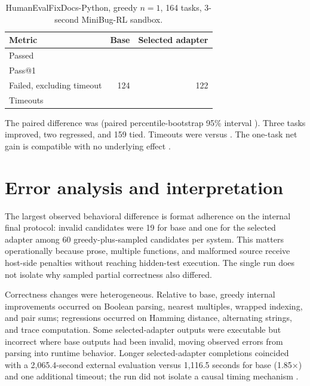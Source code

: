 \documentclass[11pt]{article}
\begin{document}
\begin{table}[ht]
\centering
\caption{HumanEvalFixDocs-Python, greedy $n=1$, 164 tasks, 3-second MiniBug-RL sandbox.}
\label{tab:external}
\begin{tabular}{@{}lrr@{}}
\toprule
Metric & Base & Selected adapter \\
\midrule
Passed & \BaseExternalPassed{} & \ModelExternalPassed{} \\
Pass@1 & \BaseExternalRate{} & \ModelExternalRate{} \\
Failed, excluding timeout & 124 & 122 \\
Timeouts & \BaseExternalTimeouts{} & \ModelExternalTimeouts{} \\
\bottomrule
\end{tabular}
\end{table}

The paired difference was \ExternalDifference{} (paired percentile-bootstrap 95\% interval \ExternalInterval{}). Three tasks improved, two regressed, and 159 tied. Timeouts were \BaseExternalTimeouts{} versus \ModelExternalTimeouts{}. The one-task net gain is compatible with no underlying effect \cite{hubresults,taskscores}.

\section{Error analysis and interpretation}

The largest observed behavioral difference is format adherence on the internal final protocol: invalid candidates were 19 for base and one for the selected adapter among 60 greedy-plus-sampled candidates per system. This matters operationally because prose, multiple functions, and malformed source receive host-side penalties without reaching hidden-test execution. The single run does not isolate why sampled partial correctness also differed.

Correctness changes were heterogeneous. Relative to base, greedy internal improvements occurred on Boolean parsing, nearest multiples, wrapped indexing, and pair sums; regressions occurred on Hamming distance, alternating strings, and trace computation. Some selected-adapter outputs were executable but incorrect where base outputs had been invalid, moving observed errors from parsing into runtime behavior. Longer selected-adapter completions coincided with a 2,065.4-second external evaluation versus 1,116.5 seconds for base (1.85$\times$) and one additional timeout; the run did not isolate a causal timing mechanism \cite{hubresults}.
\end{document}
